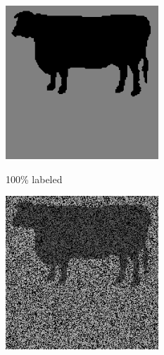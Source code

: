 \documentclass{article}
\begin{document}
\begin{figure}[htb]
\begin{minipage}[b]{.30\linewidth}
      \centerline{\includegraphics[width=\textwidth, cfbox=black 1pt 0pt]{ress/cow40/cow40_label.png}}
      \centerline{100\% labeled }\medskip
    \end{minipage}
    \hfill
    \begin{minipage}[b]{0.30\linewidth}
      \centering
      \centerline{\includegraphics[width=\textwidth,cfbox=black 1pt 0pt]{ress/cow40/cow40_miss.png}}

\end{minipage}
\end{figure}
\end{document}
